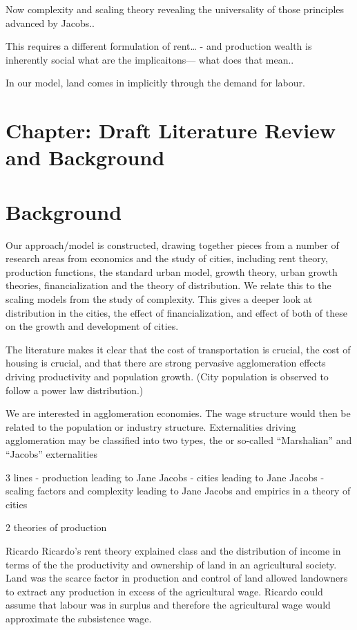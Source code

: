 Now complexity and scaling theory revealing the universality of those principles advanced by Jacobs..

This requires a different formulation of rent… - and production wealth is inherently social what are the implicaitons— what does that mean.. 






In our model, land comes in implicitly through the demand for labour. 


\section{Chapter: Draft Literature Review and Background}

\section{Background}
\label{Sec:Background}
\newpage
Our approach/model is constructed, drawing together pieces from a number of research areas from economics and the study of cities, including rent theory, production functions, the standard urban model, growth theory, urban growth theories, financialization and the theory of distribution. 
We relate this to the scaling models from the study of complexity. This gives a deeper look at distribution in the cities, the effect of financialization, and effect of both of these on the growth and development of cities. 

The literature makes it clear that the cost of transportation is crucial, the cost of housing is crucial, and that there are strong pervasive agglomeration effects driving productivity and population growth. (City population is observed to follow a power law distribution.)

We are interested in agglomeration economies. The wage  structure would then be related to the population or industry  structure. Externalities driving agglomeration may be classified  into two types, the  or so-called ``Marshalian''  and ``Jacobs'' externalities


3 lines  
- production leading to Jane Jacobs
- cities leading to Jane Jacobs
- scaling factors and complexity leading to Jane Jacobs and empirics in a theory of cities

2 theories of production

Ricardo
Ricardo’s rent theory explained class and the distribution of income in terms of the the productivity and ownership of land in an agricultural society. Land was the scarce factor in production and control of land allowed landowners to extract any production in excess of the agricultural wage. Ricardo could assume that labour was in surplus and therefore the agricultural wage would approximate the subsistence wage. 


